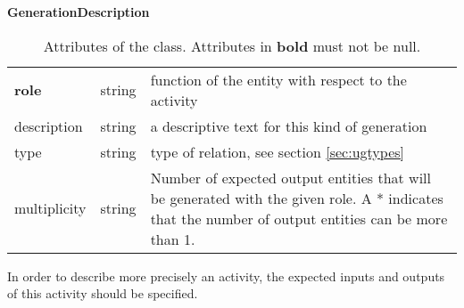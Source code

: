 \begin{table}[ht]
\small
{}\textwidth
\textbf{\normalsize GenerationDescription}\vspace{0.25em}\\
\begin{tabulary}{1.0\textwidth}{llL}
\toprule
{} &  & \\
\midrule
\textbf{role} & string & function of the entity with respect to the activity \\
description  & string & a descriptive text for this kind of generation \\
type & string   & type of relation, see section \ref{sec:ugtypes} \\
multiplicity & string & Number of expected output entities that will be generated with the given role. A * indicates that the number of output entities can be more than 1. \\
\bottomrule
\end{tabulary}
\caption[Attributes of the  class]{Attributes of the  class. Attributes in \textbf{bold} must not be null.}
\label{tab:wasgeneratedbydescription}
\end{table}


In order to describe more precisely an activity, the expected inputs and outputs of this activity should be specified.



